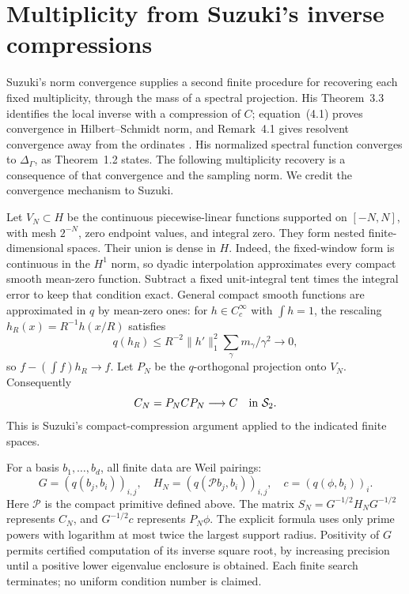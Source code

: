 \section{Multiplicity from Suzuki's inverse compressions}
\label{sec:suzuki-probes}
Suzuki's norm convergence supplies a second finite procedure for recovering
each fixed multiplicity, through the mass of a spectral projection.
His Theorem~3.3 identifies the local inverse with a compression of $C$;
equation~(4.1) proves convergence in Hilbert--Schmidt norm, and
Remark~4.1 gives resolvent convergence away from the ordinates
\cite[pp.~10--12]{suzuki}. His normalized spectral function
converges to $\Delta_\Gamma$, as Theorem~1.2 states. The following
multiplicity recovery is a consequence of that convergence and the
sampling norm. We credit the convergence mechanism to Suzuki.

Let $V_N\subset H$ be the continuous piecewise-linear functions supported
on $[-N,N]$, with mesh $2^{-N}$, zero endpoint values, and integral zero.
They form nested finite-dimensional spaces. Their union is dense in $H$.
Indeed, the fixed-window form is continuous in the $H^1$ norm, so dyadic
interpolation approximates every compact smooth mean-zero function.
Subtract a fixed unit-integral tent times the integral error to keep that
condition exact. General compact smooth functions are approximated in
$q$ by mean-zero ones: for $h\in C_c^\infty$ with $\int h=1$, the
rescaling $h_R(x)=R^{-1}h(x/R)$ satisfies
\[
 q(h_R)\le R^{-2}\|h'\|_1^2\sum_\gamma m_\gamma/\gamma^2\longrightarrow0,
\]
so $f-(\int f)h_R\to f$. Let $P_N$ be the $q$-orthogonal projection
onto $V_N$. Consequently
\begin{equation}
 C_N=P_NCP_N\longrightarrow C\quad\hbox{in }\mathcal S_2.
 \label{eq:finite-compression-limit}
\end{equation}
This is Suzuki's compact-compression argument applied to the indicated
finite spaces.

For a basis $b_1,\ldots,b_d$, all finite data are Weil pairings:
\[
 G=(q(b_j,b_i))_{i,j},\quad
 H_N=(q(\mathcal Pb_j,b_i))_{i,j},\quad
 c=(q(\phi,b_i))_i.
\]
Here $\mathcal P$ is the compact primitive defined above. The matrix
$S_N=G^{-1/2}H_NG^{-1/2}$ represents $C_N$, and $G^{-1/2}c$ represents
$P_N\phi$. The explicit formula uses only prime powers with logarithm
at most twice the largest support radius. Positivity of $G$ permits
certified computation of its inverse square root, by increasing precision
until a positive lower eigenvalue enclosure is obtained. Each finite
search terminates; no uniform condition number is claimed.

